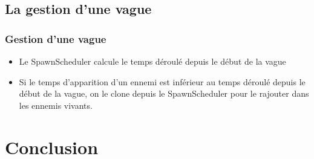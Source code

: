 \documentclass[pdf]{beamer}
\begin{document}
\subsection{La gestion d'une vague}
\begin{frame}
    \frametitle{Gestion d'une vague}
        \begin{itemize}
            \item Le SpawnScheduler calcule le temps déroulé depuis le début de
                la vague
            \item Si le temps d'apparition d'un ennemi est inférieur au temps
                déroulé depuis le début de la vague, on le clone depuis le
                SpawnScheduler pour le rajouter dans les ennemis vivants.
        \end{itemize}
    \end{frame}
\section{Conclusion}
\end{document}
